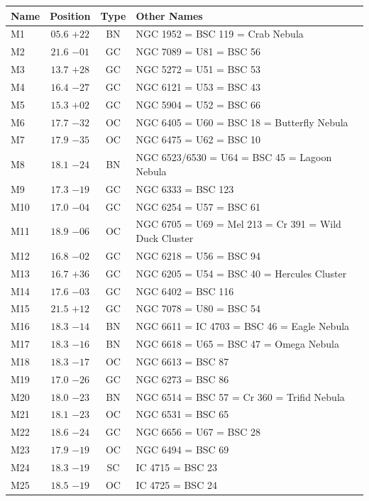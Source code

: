 
\begin{table}[t]
    \setlength{\tabcolsep}{2pt}
    \footnotesize
    \begin{tabularx}{\linewidth}{lccX}
        \hline
        Name&Position&Type&Other Names\\
        \hline

M1   &$05.6$ $+22$&BN &NGC 1952 = BSC 119 = Crab Nebula\\
M2   &$21.6$ $-01$&GC &NGC 7089 = U81 = BSC 56\\
M3   &$13.7$ $+28$&GC &NGC 5272 = U51 = BSC 53\\
M4   &$16.4$ $-27$&GC &NGC 6121 = U53 = BSC 43\\
M5   &$15.3$ $+02$&GC &NGC 5904 = U52 = BSC 66\\
M6   &$17.7$ $-32$&OC &NGC 6405 = U60 = BSC 18 = Butterfly Nebula\\
M7   &$17.9$ $-35$&OC &NGC 6475 = U62 = BSC 10\\
M8   &$18.1$ $-24$&BN &NGC 6523/6530 = U64 = BSC 45 = Lagoon Nebula\\
M9   &$17.3$ $-19$&GC &NGC 6333 = BSC 123\\
M10  &$17.0$ $-04$&GC &NGC 6254 = U57 = BSC 61\\
M11  &$18.9$ $-06$&OC &NGC 6705 = U69 = Mel 213 = Cr 391 = Wild Duck Cluster\\
M12  &$16.8$ $-02$&GC &NGC 6218 = U56 = BSC 94\\
M13  &$16.7$ $+36$&GC &NGC 6205 = U54 = BSC 40 = Hercules Cluster\\
M14  &$17.6$ $-03$&GC &NGC 6402 = BSC 116\\
M15  &$21.5$ $+12$&GC &NGC 7078 = U80 = BSC 54\\
M16  &$18.3$ $-14$&BN &NGC 6611 = IC 4703 = BSC 46 = Eagle Nebula\\
M17  &$18.3$ $-16$&BN &NGC 6618 = U65 = BSC 47 = Omega Nebula\\
M18  &$18.3$ $-17$&OC &NGC 6613 = BSC 87\\
M19  &$17.0$ $-26$&GC &NGC 6273 = BSC 86\\
M20  &$18.0$ $-23$&BN &NGC 6514 = BSC 57 = Cr 360 = Trifid Nebula\\
M21  &$18.1$ $-23$&OC &NGC 6531 = BSC 65\\
M22  &$18.6$ $-24$&GC &NGC 6656 = U67 = BSC 28\\
M23  &$17.9$ $-19$&OC &NGC 6494 = BSC 69\\
M24  &$18.3$ $-19$&SC &IC 4715 = BSC 23\\
M25  &$18.5$ $-19$&OC &IC 4725 = BSC 24\\

\end{tabularx}
\end{table}

